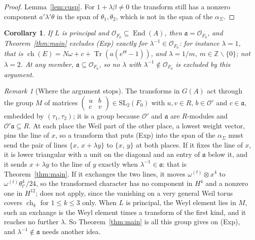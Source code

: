\documentclass[11pt]{amsart}
\newtheorem{corollary}[theorem]{Corollary}
\theoremstyle{definition}
\theoremstyle{remark}
\newtheorem{remark}[theorem]{Remark}
\newcommand{\ZZ}{\mathbb{Z}}
\newcommand{\cO}{\mathcal{O}}
\newcommand{\fa}{\mathfrak{a}}
\newcommand{\ch}{\operatorname{ch}}
\newcommand{\End}{\operatorname{End}}
\newcommand{\Tr}{\operatorname{Tr}}
\newcommand{\SL}{\mathrm{SL}}
\begin{document}
\begin{proof}
Lemma~\ref{lem:cusp}. For $1+\lambda\beta\neq0$ the transform still has a
nonzero component $a'\lambda'\theta$ in the span of $\theta_{1},\theta_{2}$,
which is not in the span of the $\alpha_{\Sigma}$.
\end{proof}

\begin{corollary}\label{cor:principal}
If $L$ is principal and $\cO_{F_{0}}\subseteq\End(A)$, then $\fa=\cO_{F_{0}}$,
and Theorem~\ref{thm:main} excludes \textup{(Exp)} exactly for
$\lambda^{-1}\in\cO_{F_{0}}$: for instance $\lambda=1$, that is
$\ch(E)=N\omega+c+\Tr(a(e^{\Theta}-1))$, and $\lambda=1/m$, $m\in\ZZ\smallsetminus\{0\}$; not
$\lambda=2$. At any member, $\fa\subseteq\cO_{F_{0}}$, so no $\lambda$ with
$\lambda^{-1}\notin\cO_{F_{0}}$ is excluded by this argument.
\end{corollary}

\begin{remark}[Where the argument stops]\label{rem:swap}
The transforms in $G(A)$ act through the group $M$ of matrices
$\left(\begin{smallmatrix}u&b\\c&v\end{smallmatrix}\right)\in\SL_{2}(F_{0})$
with $u,v\in R$, $b\in\cO'$ and $c\in\fa$, embedded by
$(\tau_{1},\tau_{2})$; it is a group because $\cO'$ and $\fa$ are
$R$-modules and $\cO'\fa\subseteq R$. At each place the Weil part
of the other place, a lowest weight vector, pins the line of $x$, so a
transform that puts \textup{(Exp)} into the span of the $\alpha_{\Sigma}$
must send the pair of lines $\{x,\,x+\lambda y\}$ to $\{x,\,y\}$ at both
places. If it fixes the line of $x$, it is lower triangular with a unit on
the diagonal and an entry of $\fa$ below it, and it sends $x+\lambda y$ to the
line of $y$ exactly when $\lambda^{-1}\in\fa$: that is
Theorem~\ref{thm:main}. If it exchanges the two lines, it moves
$\omega^{(t)}\otimes x^{4}$ to $\omega^{(t)}\theta_{t'}^{4}/24$, so the
transformed character has no component in $H^{4}$ and a nonzero one in
$H^{12}$; \cite[Theorem~19.12]{BMB} does not apply, since the vanishing on a
very general Weil torus \cite[Proposition~19.11]{BMB} covers $\ch_{k}$ for
$1\le k\le3$ only. When $L$ is principal, the Weyl element lies in $M$, such an
exchange is the Weyl element times a transform of the first kind, and it
reaches no further $\lambda$. So Theorem~\ref{thm:main} is all this group
gives on \textup{(Exp)}, and $\lambda^{-1}\notin\fa$ needs another idea.
\end{remark}
\end{document}
